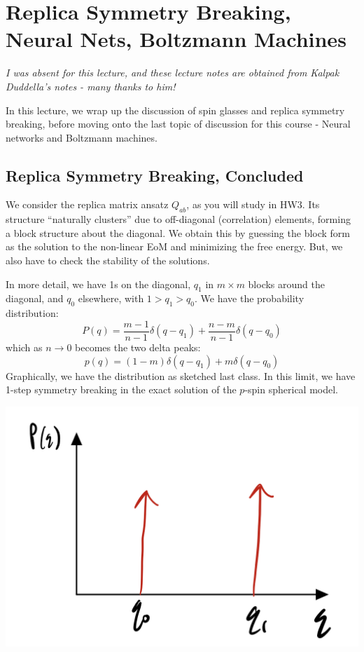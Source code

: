 \section{Replica Symmetry Breaking, Neural Nets, Boltzmann Machines}

\emph{I was absent for this lecture, and these lecture notes are obtained from Kalpak Duddella's notes - many thanks to him!}

In this lecture, we wrap up the discussion of spin glasses and replica symmetry breaking, before moving onto the last topic of discussion for this course - Neural networks and Boltzmann machines.

\subsection{Replica Symmetry Breaking, Concluded}
We consider the replica matrix ansatz $Q_{ab}$, as you will study in HW3. Its structure ``naturally clusters'' due to off-diagonal (correlation) elements, forming a block structure about the diagonal. We obtain this by guessing the block form as the solution to the non-linear EoM and minimizing the free energy. But, we also have to check the stability of the solutions.

In more detail, we have 1s on the diagonal, $q_1$ in $m \times m$ blocks around the diagonal, and $q_0$ elsewhere, with $1 > q_1 > q_0$. We have the probability distribution:
\begin{equation}
    P(q) = \frac{m-1}{n-1}\delta(q - q_1) + \frac{n-m}{n-1}\delta(q - q_0)
\end{equation}
which as $n \to 0$ becomes the two delta peaks:
\begin{equation}
    p(q) = (1-m)\delta(q - q_1) + m\delta(q - q_0)
\end{equation}
Graphically, we have the distribution as sketched last class. In this limit, we have 1-step symmetry breaking in the exact solution of the $p$-spin spherical model.

\begin{center}
    \includegraphics[scale=0.35]{Lectures/Figures/lec15-1stepsymbreak.png}
\end{center}

